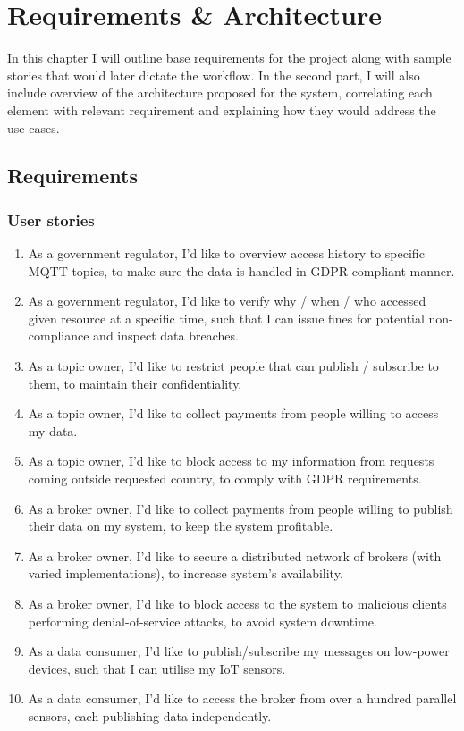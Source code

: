 \chapter{Requirements \& Architecture}
In this chapter I will outline base requirements for the project along with sample stories that would later dictate the workflow. In the second part, I will also include overview of the architecture proposed for the system, correlating each element with relevant requirement and explaining how they would address the use-cases.

\section{Requirements}

\subsection{User stories}

\begin{enumerate}
\item As a government regulator, I'd like to overview access history to specific MQTT topics, to make sure the data is handled in GDPR-compliant manner.
\item As a government regulator, I'd like to verify why / when / who accessed given resource at a specific time, such that I can issue fines for potential non-compliance and inspect data breaches.
\item As a topic owner, I'd like to restrict people that can publish / subscribe to them, to maintain their confidentiality.
\item As a topic owner, I'd like to collect payments from people willing to access my data.
\item As a topic owner, I'd like to block access to my information from requests coming outside requested country, to comply with GDPR requirements.
\item As a broker owner, I'd like to collect payments from people willing to publish their data on my system, to keep the system profitable.
\item As a broker owner, I'd like to secure a distributed network of brokers (with varied implementations), to increase system's availability. 
\item As a broker owner, I'd like to block access to the system to malicious clients performing denial-of-service attacks, to avoid system downtime.
\item As a data consumer, I'd like to publish/subscribe my messages on low-power devices, such that I can utilise my IoT sensors.
\item As a data consumer, I'd like to access the broker from over a hundred parallel sensors, each publishing data independently.
\end{enumerate}

